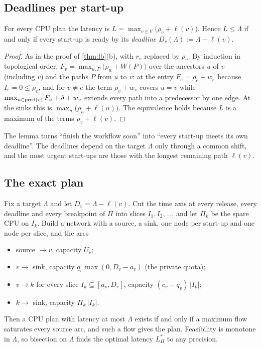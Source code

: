 \subsection{Deadlines per start-up}

\begin{lemma}
\label{lem:cpu-deadlines}
For every CPU plan the latency is $L = \max_{v \in V} \bigl(\rho_v + \ell(v)\bigr)$. Hence
$L \le \Lambda$ if and only if every start-up is ready by its \emph{deadline}
$D_v(\Lambda) := \Lambda - \ell(v)$.
\end{lemma}

\begin{proof}
As in the proof of \cref{thm:lb}(b), with $r_v$ replaced by $\rho_v$. By induction in
topological order, $F_v = \max_{u, P} \bigl(\rho_u + W(P)\bigr)$ over the ancestors $u$ of $v$
(including $v$) and the paths $P$ from $u$ to $v$: at the entry $F_e = \rho_e + w_e$ because
$I_e = 0 \le \rho_e$, and for $v \ne e$ the term $\rho_v + w_v$ covers $u = v$ while
$\max_{u \in \operatorname{pred}(v)} F_u + \delta + w_v$ extends every path into a predecessor by one edge. At
the sinks this is $\max_u \bigl(\rho_u + \ell(u)\bigr)$. The equivalence holds because $L$ is a
maximum of the terms $\rho_v + \ell(v)$.
\end{proof}

The lemma turns ``finish the workflow soon'' into ``every start-up meets its own deadline''. The
deadlines depend on the target $\Lambda$ only through a common shift, and the most urgent
start-ups are those with the longest remaining path $\ell(v)$.

\subsection{The exact plan}

\begin{theorem}
\label{thm:cpu-flow}
Fix a target $\Lambda$ and let $D_v = \Lambda - \ell(v)$. Cut the time axis at every release,
every deadline and every breakpoint of $\Pi$ into slices $I_1, I_2, \dots$, and let $\Pi_k$ be the
spare CPU on $I_k$. Build a network with a source, a sink, one node per start-up and one node per
slice, and the arcs
\begin{itemize}
  \item source $\to v$, capacity $U_v$;
  \item $v \to$ sink, capacity $q_v \max(0, D_v - a_v)$ (the private quota);
  \item $v \to k$ for every slice $I_k \subseteq [a_v, D_v]$, capacity $(c_v - q_v)\,|I_k|$;
  \item $k \to$ sink, capacity $\Pi_k\,|I_k|$.
\end{itemize}
Then a CPU plan with latency at most $\Lambda$ exists if and only if a maximum flow saturates
every source arc, and such a flow gives the plan. Feasibility is monotone in $\Lambda$, so
bisection on $\Lambda$ finds the optimal latency $L^*_\Pi$ to any precision.
\end{theorem}

